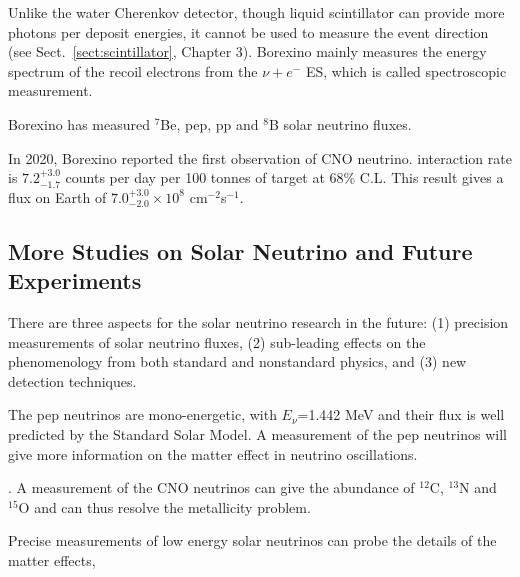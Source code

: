 Unlike the water Cherenkov detector, though liquid scintillator can provide more photons per deposit energies, it cannot be used to measure the event direction (see Sect.~\ref{sect:scintillator}, Chapter 3). Borexino mainly measures the energy spectrum of the recoil electrons from the $\nu+e^-$ ES, which is called spectroscopic measurement\cite{agostini2020improved}.


Borexino has measured $^7$Be, pep, pp and $^8$B solar neutrino fluxes\cite{agostini2018comprehensive}. 

In 2020, Borexino reported the first observation of CNO neutrino\cite{borexino2020experimental}. interaction rate is $7.2^{+3.0}_{-1.7}$ counts per day per 100 tonnes of target at 68\% C.L. This result gives a flux on Earth of $7.0^{+3.0}_{-2.0}\times 10^8$ cm$^{-2}$s$^{-1}$.

%

\subsection{More Studies on Solar Neutrino and Future Experiments}\label{sect:futureSolar}
There are three aspects for the solar neutrino research in the future: (1) precision measurements of solar neutrino fluxes, (2) 
sub-leading effects on the phenomenology from both standard and nonstandard physics, and (3) new detection techniques\cite{antonio2018state}.

The pep neutrinos are mono-energetic, with $E_\nu$=1.442 MeV and their flux is well predicted by the Standard Solar Model\cite{davini2016cno}. A measurement of the pep neutrinos will give more information on the matter effect in neutrino oscillations. 


. A measurement of the CNO neutrinos can give the abundance of $^{12}$C, $^{13}$N and $^{15}$O and can thus resolve the metallicity problem\cite{cerdeno2018cno}.

Precise measurements of low energy solar neutrinos can probe the details of the matter effects, 

